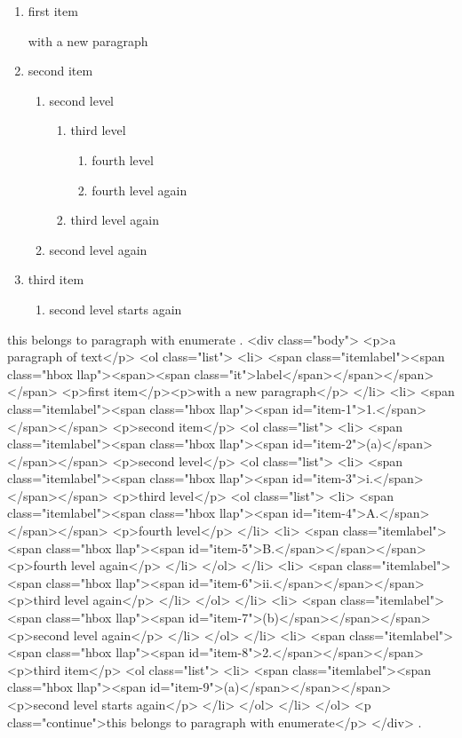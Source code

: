 \begin{enumerate}
    \item[\itshape label] first item

        with a new paragraph
    \item second item
        \begin{enumerate}
            \item second level
                \begin{enumerate}
                    \item third level
                        \begin{enumerate}
                            \item fourth level
                            \item fourth level again
                        \end{enumerate}
                    \item third level again
                \end{enumerate}
            \item second level again
        \end{enumerate}
    \item third item
        \begin{enumerate}
            \item second level starts again
        \end{enumerate}
\end{enumerate}
this belongs to paragraph with enumerate
.
<div class="body">
<p>a paragraph of text</p>
<ol class="list">
<li>
<span class="itemlabel"><span class="hbox llap"><span><span class="it">label</span></span></span></span>
<p>ﬁrst item</p><p>with a new paragraph</p>
</li>
<li>
<span class="itemlabel"><span class="hbox llap"><span id="item-1">1.</span></span></span>
<p>second item</p>
<ol class="list">
<li>
<span class="itemlabel"><span class="hbox llap"><span id="item-2">(a)</span></span></span>
<p>second level</p>
<ol class="list">
<li>
<span class="itemlabel"><span class="hbox llap"><span id="item-3">i.</span></span></span>
<p>third level</p>
<ol class="list">
<li>
<span class="itemlabel"><span class="hbox llap"><span id="item-4">A.</span></span></span>
<p>fourth level</p>
</li>
<li>
<span class="itemlabel"><span class="hbox llap"><span id="item-5">B.</span></span></span>
<p>fourth level again</p>
</li>
</ol>
</li>
<li>
<span class="itemlabel"><span class="hbox llap"><span id="item-6">ii.</span></span></span>
<p>third level again</p>
</li>
</ol>
</li>
<li>
<span class="itemlabel"><span class="hbox llap"><span id="item-7">(b)</span></span></span>
<p>second level again</p>
</li>
</ol>
</li>
<li>
<span class="itemlabel"><span class="hbox llap"><span id="item-8">2.</span></span></span>
<p>third item</p>
<ol class="list">
<li>
<span class="itemlabel"><span class="hbox llap"><span id="item-9">(a)</span></span></span>
<p>second level starts again</p>
</li>
</ol>
</li>
</ol>
<p class="continue">this belongs to paragraph with enumerate</p>
</div>
.


